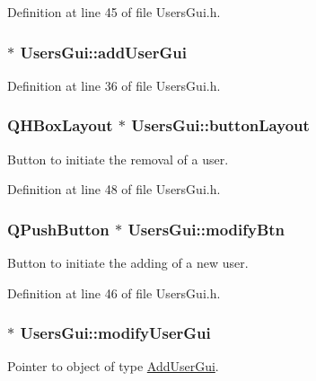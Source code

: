 Definition at line 45 of file Users\-Gui.\-h.

\hypertarget{class_users_gui_a924224ccc0c66bafbd23ef8160a864ac}{
\subsubsection[{add\-User\-Gui}]{ $\ast$ Users\-Gui\-::add\-User\-Gui\hspace{0.3cm}{\ttfamily [private]}}}\label{class_users_gui_a924224ccc0c66bafbd23ef8160a864ac}


Definition at line 36 of file Users\-Gui.\-h.

\hypertarget{class_users_gui_a007a2cbe56519f9df8492d4632e06285}{
\subsubsection[{button\-Layout}]{\setlength{\rightskip}{0pt plus 5cm}Q\-H\-Box\-Layout $\ast$ Users\-Gui\-::button\-Layout\hspace{0.3cm}{\ttfamily [private]}}}\label{class_users_gui_a007a2cbe56519f9df8492d4632e06285}
Button to initiate the removal of a user. 

Definition at line 48 of file Users\-Gui.\-h.

\hypertarget{class_users_gui_a127be893a811158fa4955ce7c7cb38e0}{
\subsubsection[{modify\-Btn}]{\setlength{\rightskip}{0pt plus 5cm}Q\-Push\-Button $\ast$ Users\-Gui\-::modify\-Btn\hspace{0.3cm}{\ttfamily [private]}}}\label{class_users_gui_a127be893a811158fa4955ce7c7cb38e0}
Button to initiate the adding of a new user. 

Definition at line 46 of file Users\-Gui.\-h.

\hypertarget{class_users_gui_ab471067855fb1bb29765b84d95757d15}{
\subsubsection[{modify\-User\-Gui}]{ $\ast$ Users\-Gui\-::modify\-User\-Gui\hspace{0.3cm}{\ttfamily [private]}}}\label{class_users_gui_ab471067855fb1bb29765b84d95757d15}
Pointer to object of type \hyperlink{class_add_user_gui}{Add\-User\-Gui}. 

